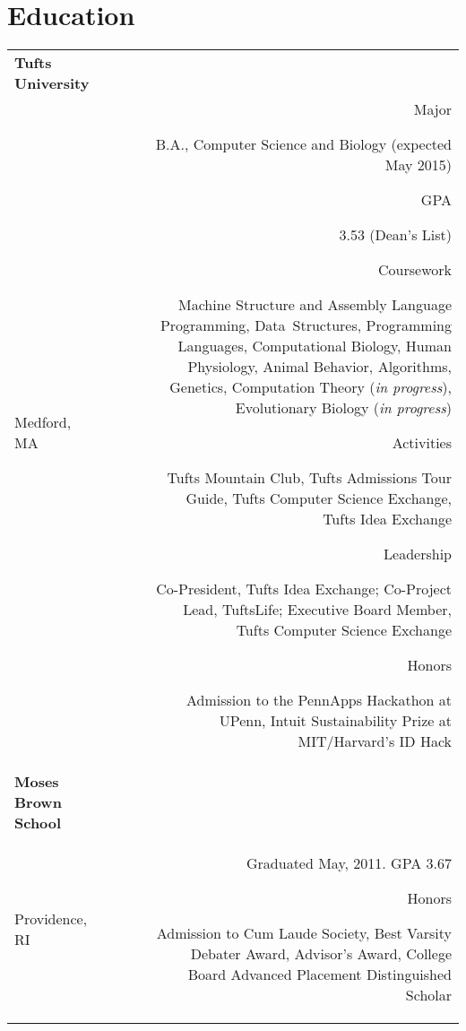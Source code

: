 \section*{Education}
\begin{tabular}{L!{\VRule}R}
\textbf{Tufts University} \\ Medford, MA &
\vspace{-16.7pt}
\begin{description}
\item[Major] B.A., Computer Science and Biology (expected May 2015)
\item[GPA] 3.53 (Dean's List)
\item[Coursework] Machine Structure and Assembly Language Programming, Data~Structures, Programming Languages, Computational Biology, Human Physiology, Animal Behavior, Algorithms, Genetics, Computation Theory ({\em in progress}), Evolutionary Biology ({\em in progress})
\item[Activities] Tufts Mountain Club, Tufts Admissions Tour Guide, Tufts Computer Science Exchange, Tufts Idea Exchange
\item[Leadership] Co-President, Tufts Idea Exchange; Co-Project Lead, TuftsLife; Executive Board Member, Tufts Computer Science Exchange
\item[Honors] Admission to the PennApps Hackathon at UPenn, Intuit Sustainability Prize at MIT/Harvard's ID Hack
\end{description} \\
\textbf{Moses Brown School} \\ Providence, RI &
Graduated May, 2011. GPA 3.67
\begin{description}
\item[Honors] Admission to Cum Laude Society, Best Varsity Debater Award, Advisor's Award, College Board Advanced Placement Distinguished Scholar
\end{description}
\end{tabular}
